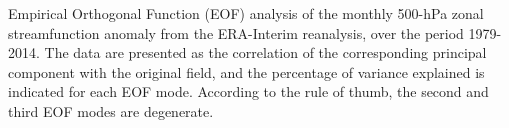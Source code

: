 \label{fig:eof}
Empirical Orthogonal Function (EOF) analysis of the monthly 500-hPa zonal streamfunction anomaly from the ERA-Interim reanalysis, over the period 1979-2014. The data are presented as the correlation of the corresponding principal component with the original field, and the percentage of variance explained is indicated for each EOF mode. According to the \citet{North1982} rule of thumb, the second and third EOF modes are degenerate.